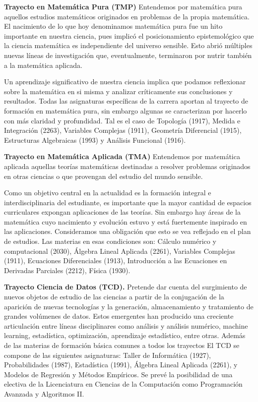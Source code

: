 \documentclass[a4paper, 12pt]{article}
\begin{document}
\begin{description}


\item{\textbf{Trayecto en Matemática Pura (TMP)}} Entendemos por matemática pura aquellos estudios  matemáticos originados en problemas de la propia matemática. El nacimiento de lo que hoy denominamos  matemática pura fue un hito importante en  nuestra ciencia, pues implicó el posicionamiento epistemológico que la ciencia matemática es independiente del universo sensible. Esto abrió múltiples nuevas líneas de investigación que, eventualmente, terminaron por nutrir también a la matemática aplicada. 

Un aprendizaje significativo de nuestra ciencia implica que podamos reflexionar sobre la matemática en si  misma y analizar críticamente sus conclusiones y resultados. Todas las asignaturas específicas  de la carrera aportan al trayecto de formación en matemática pura, sin embargo algunas se caracterizan por hacerlo con más claridad y profundidad. Tal es el caso de Topología (1917), Medida e Integración (2263), Variables Complejas (1911), Geometría Diferencial (1915), Estructuras Algebraicas (1993) y Análisis Funcional (1916). 

 
\item{\textbf{Trayecto en Matemática Aplicada (TMA)}} Entendemos por matemática aplicada aquellas teorías matemáticas destinadas a resolver problemas originados en  otras ciencias o que provengan del estudio  del  mundo sensible. 

Como un objetivo central en la actualidad es la formación integral e interdisciplinaria del estudiante, es importante que la mayor cantidad de  espacios curriculares  expongan aplicaciones de las teorías. Sin embargo hay áreas de la matemática cuyo  nacimiento y evolución
estuvo y está fuertemente inspirado en las aplicaciones. Consideramos una obligación que esto se vea reflejado en el plan de estudios. Las materias en esas condiciones son: Cálculo numérico y computacional (2030), Álgebra Lineal Aplicada (2261), Variables Complejas (1911), Ecuaciones Diferenciales (1913), Introducción a las Ecuaciones en Derivadas Parciales (2212), Física (1930).




\item{\textbf{Trayecto Ciencia de Datos (TCD).}}   Pretende dar cuenta del surgimiento de nuevos objetos de estudio de las ciencias a partir de la conjugación de la aparición de nuevas tecnologías y la generación, almacenamiento y tratamiento de grandes volúmenes de datos. Estos emergentes han producido una creciente articulación entre líneas disciplinares como análisis y análisis numérico, machine learning, estadística, optimización, aprendizaje
estadístico, entre otras. Además de las materias de formación básica comunes a todos los trayectos El TCD se compone de las siguientes asignaturas: Taller de Informática (1927), Probabilidades (1987), Estadística (1991), Álgebra Lineal Aplicada (2261),  y Modelos de Regresión y Métodos Empíricos.  Se prevé la posibilidad de una electiva  de la Licenciatura en Ciencias de la Computación como Programación Avanzada y Algoritmos II. 





\end{description}
\end{document}
